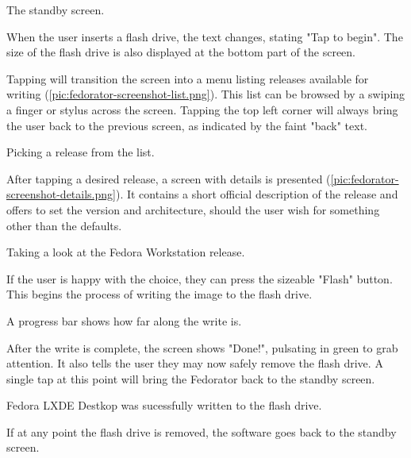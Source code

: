             {The standby screen.}
        
        When the user inserts a flash drive, the text changes, stating "Tap to begin".  The size of the flash drive is also displayed at the bottom part of the screen.
        
        Tapping will transition the screen into a menu listing releases available for writing (\ref{pic:fedorator-screenshot-list.png}).  This list can be browsed by a swiping a finger or stylus across the screen.  Tapping the top left corner will always bring the user back to the previous screen, as indicated by the faint "back" text. 
        
            {Picking a release from the list.}
        
        After tapping a desired release, a screen with details is presented (\ref{pic:fedorator-screenshot-details.png}).  It contains a short official description of the release and offers to set the version and architecture, should the user wish for something other than the defaults.
        
            {Taking a look at the Fedora Workstation release.}
        
        If the user is happy with the choice, they can press the sizeable "Flash" button.  This begins the process of writing the image to the flash drive.
        
        
        A progress bar shows how far along the write is.
        
        After the write is complete, the screen shows "Done!", pulsating in green to grab attention.  It also tells the user they may now safely remove the flash drive.  A single tap at this point will bring the Fedorator back to the standby screen.
        
            {Fedora LXDE Destkop was sucessfully written to the flash drive. }
        
        If at any point the flash drive is removed, the software goes back to the standby screen.
        
